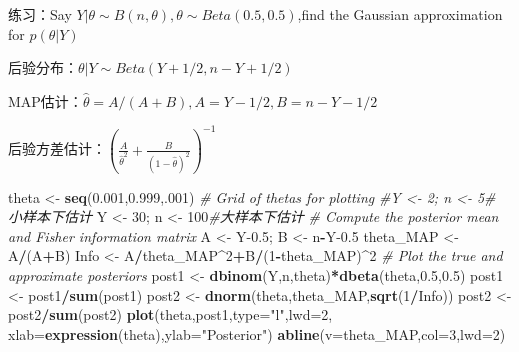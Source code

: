 \documentclass[
]{book}
\newenvironment{Shaded}{\begin{snugshade}}{\end{snugshade}}
\newcommand{\AttributeTok}[1]{\textcolor[rgb]{0.13,0.29,0.53}{#1}}
\newcommand{\CommentTok}[1]{\textcolor[rgb]{0.56,0.35,0.01}{\textit{#1}}}
\newcommand{\DecValTok}[1]{\textcolor[rgb]{0.00,0.00,0.81}{#1}}
\newcommand{\FloatTok}[1]{\textcolor[rgb]{0.00,0.00,0.81}{#1}}
\newcommand{\FunctionTok}[1]{\textcolor[rgb]{0.13,0.29,0.53}{\textbf{#1}}}
\newcommand{\NormalTok}[1]{#1}
\newcommand{\OtherTok}[1]{\textcolor[rgb]{0.56,0.35,0.01}{#1}}
\newcommand{\SpecialCharTok}[1]{\textcolor[rgb]{0.81,0.36,0.00}{\textbf{#1}}}
\newcommand{\StringTok}[1]{\textcolor[rgb]{0.31,0.60,0.02}{#1}}
\begin{document}
练习：Say \(Y|\theta\sim B(n,\theta),\theta\sim Beta(0.5,0.5)\),find the Gaussian approximation for \(p(\theta|Y)\)

后验分布：\(\theta|Y\sim Beta(Y+1/2,n-Y+1/2)\)

MAP估计：\(\hat{\theta}=A/(A+B),A=Y-1/2,B=n-Y-1/2\)

后验方差估计：\((\frac{A}{\hat{\theta}^2}+\frac{B}{(1-\hat{\theta})^2})^{-1}\)

\begin{Shaded}
\begin{Highlighting}[]
\NormalTok{theta }\OtherTok{\textless{}{-}} \FunctionTok{seq}\NormalTok{(}\FloatTok{0.001}\NormalTok{,}\FloatTok{0.999}\NormalTok{,.}\DecValTok{001}\NormalTok{) }\CommentTok{\# Grid of thetas for plotting}
\CommentTok{\#Y \textless{}{-} 2; n \textless{}{-} 5\# 小样本下估计}
\NormalTok{Y }\OtherTok{\textless{}{-}} \DecValTok{30}\NormalTok{; n  }\OtherTok{\textless{}{-}} \DecValTok{100}\CommentTok{\#大样本下估计}
\CommentTok{\# Compute the posterior mean and Fisher information matrix}
\NormalTok{A }\OtherTok{\textless{}{-}}\NormalTok{ Y}\FloatTok{{-}0.5}\NormalTok{; B }\OtherTok{\textless{}{-}}\NormalTok{ n}\SpecialCharTok{{-}}\NormalTok{Y}\FloatTok{{-}0.5}
\NormalTok{theta\_MAP }\OtherTok{\textless{}{-}}\NormalTok{ A}\SpecialCharTok{/}\NormalTok{(A}\SpecialCharTok{+}\NormalTok{B)}
\NormalTok{Info  }\OtherTok{\textless{}{-}}\NormalTok{ A}\SpecialCharTok{/}\NormalTok{theta\_MAP}\SpecialCharTok{\^{}}\DecValTok{2}\SpecialCharTok{+}\NormalTok{B}\SpecialCharTok{/}\NormalTok{(}\DecValTok{1}\SpecialCharTok{{-}}\NormalTok{theta\_MAP)}\SpecialCharTok{\^{}}\DecValTok{2}
\CommentTok{\# Plot the true and approximate posteriors}
\NormalTok{post1 }\OtherTok{\textless{}{-}} \FunctionTok{dbinom}\NormalTok{(Y,n,theta)}\SpecialCharTok{*}\FunctionTok{dbeta}\NormalTok{(theta,}\FloatTok{0.5}\NormalTok{,}\FloatTok{0.5}\NormalTok{)}
\NormalTok{post1 }\OtherTok{\textless{}{-}}\NormalTok{ post1}\SpecialCharTok{/}\FunctionTok{sum}\NormalTok{(post1)}
\NormalTok{post2 }\OtherTok{\textless{}{-}} \FunctionTok{dnorm}\NormalTok{(theta,theta\_MAP,}\FunctionTok{sqrt}\NormalTok{(}\DecValTok{1}\SpecialCharTok{/}\NormalTok{Info))}
\NormalTok{post2 }\OtherTok{\textless{}{-}}\NormalTok{ post2}\SpecialCharTok{/}\FunctionTok{sum}\NormalTok{(post2)}
\FunctionTok{plot}\NormalTok{(theta,post1,}\AttributeTok{type=}\StringTok{"l"}\NormalTok{,}\AttributeTok{lwd=}\DecValTok{2}\NormalTok{,}
     \AttributeTok{xlab=}\FunctionTok{expression}\NormalTok{(theta),}\AttributeTok{ylab=}\StringTok{"Posterior"}\NormalTok{)}
\FunctionTok{abline}\NormalTok{(}\AttributeTok{v=}\NormalTok{theta\_MAP,}\AttributeTok{col=}\DecValTok{3}\NormalTok{,}\AttributeTok{lwd=}\DecValTok{2}\NormalTok{)}

\end{Highlighting}
\end{Shaded}
\end{document}
